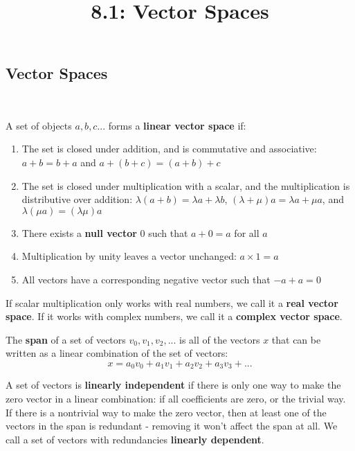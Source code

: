 \documentclass{article}
\title{8.1: Vector Spaces}
\begin{document}
\maketitle

\subsection{Vector Spaces}
\ 
\begin{definition}
    A set of objects $a,b,c...$ forms a \textbf{linear vector space} if:
    \begin{enumerate}   
        \item The set is closed under addition, and is commutative and associative: $a+b = b+a$ and $a+(b+c) = (a+b)+c$
        \item The set is closed under multiplication with a scalar, and the multiplication is distributive over addition: $\lambda(a+b) = \lambda a + \lambda b$, $(\lambda + \mu)a = \lambda a + \mu a$, and $\lambda (\mu a) = (\lambda\mu)a$
        \item There exists a \textbf{null vector} $0$ such that $a+0 = a$ for all $a$
        \item Multiplication by unity leaves a vector unchanged: $a \times 1 = a$
        \item All vectors have a corresponding negative vector such that $-a + a = 0$
    \end{enumerate}  
\end{definition}

If scalar multiplication only works with real numbers, we call it a \textbf{real vector space}. If it works with complex numbers, we call it a \textbf{complex vector space}.

\begin{definition}[Span]
The \textbf{span} of a set of vectors $v_0,v_1,v_2,...$ is all of the vectors $x$ that can be written as a linear combination of the set of vectors: $$x = a_0v_0 + a_1v_1 + a_2v_2 + a_3v_3 + ... $$
\end{definition}

\begin{definition}
A set of vectors is \textbf{linearly independent} if there is only one way to make the zero vector in a linear combination: if all coefficients are zero, or the trivial way. If there is a nontrivial way to make the zero vector, then at least one of the vectors in the span is redundant - removing it won't affect the span at all. We call a set of vectors with redundancies \textbf{linearly dependent}.
\end{definition}
\end{document}
